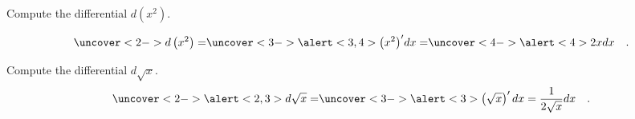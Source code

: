 \begin{frame}
\begin{example}
Compute the differential $d\left( x^2\right)$.

\[
\uncover<2->{d\left(x^2\right)=}\uncover<3->{ \alert<3,4>{\left(x^2\right)'} dx=} \uncover<4->{\alert<4>{2x} dx\quad .}
\]
\end{example}
\end{frame}
\begin{frame}
\begin{example}
Compute the differential $d \sqrt{x}$.
\[
\uncover<2->{\alert<2,3>{d\sqrt{x}=}}\uncover<3->{\alert<3>{\left(\sqrt{x}\right)'dx=  \frac{1}{2\sqrt{x}}dx }\quad .}
\]
\end{example}
\end{frame}

